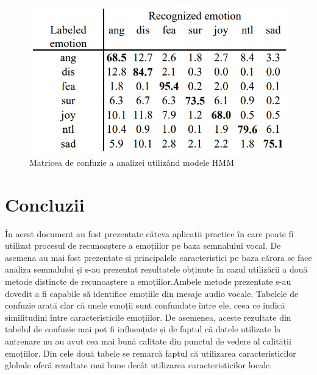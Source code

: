 \documentclass[9pt,shortpaper,twoside,web]{ieeecolor}
\begin{document}
\begin{figure}[htb]
\includegraphics[width=0.9\columnwidth]{res/fig/HMM}
\caption{Matricea de confuzie a analizei utilizând modele HMM \cite{b8}}
\label{fig5}
\end{figure}

\section{Concluzii}
În acest document au fost prezentate câteva aplicații practice în care poate fi utilizat procesul de recunoaștere a emoțiilor pe baza semnalului vocal. De asemena au mai fost prezentate și principalele caracteristici pe baza cărora se face analiza semnalului și s-au prezentat rezultatele obținute în cazul utilizării a două metode distincte de recunoaștere a emoțiilor.Ambele metode prezentate s-au dovedit a fi capabile să identifice emoțiile din mesaje audio vocale. Tabelele de confuzie arată clar că unele emoții sunt confundate între ele, ceea ce indică similitudini între caracteristicile emoțiilor. De asemenea, aceste rezultate din tabelul de confuzie mai pot fi influențate și de faptul că datele utilizate la antrenare nu au avut cea mai bună calitate din punctul de vedere al calității emoțiilor. Din cele două tabele se remarcă faptul că utilizarea caracteristicilor globale oferă rezultate mai bune decât utilizarea caracteristicilor locale. 
\end{document}
